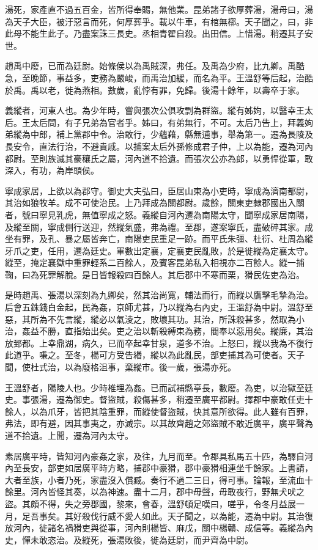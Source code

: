 湯死，家產直不過五百金，皆所得奉賜，無他業。昆弟諸子欲厚葬湯，湯母曰，湯為天子大臣，被汙惡言而死，何厚葬乎。載以牛車，有棺無槨。天子聞之，曰，非此母不能生此子。乃盡案誅三長史。丞相青翟自殺。出田信。上惜湯。稍遷其子安世。

趙禹中廢，已而為廷尉。始條侯以為禹賊深，弗任。及禹為少府，比九卿。禹酷急，至晚節，事益多，吏務為嚴峻，而禹治加緩，而名為平。王溫舒等后起，治酷於禹。禹以老，徙為燕相。數歲，亂悖有罪，免歸。後湯十餘年，以壽卒于家。

義縱者，河東人也。為少年時，嘗與張次公俱攻剽為群盜。縱有姊姁，以醫幸王太后。王太后問，有子兄弟為官者乎。姊曰，有弟無行，不可。太后乃告上，拜義姁弟縱為中郎，補上黨郡中令。治敢行，少蘊藉，縣無逋事，舉為第一。遷為長陵及長安令，直法行治，不避貴戚。以捕案太后外孫修成君子仲，上以為能，遷為河內都尉。至則族滅其豪穰氏之屬，河內道不拾遺。而張次公亦為郎，以勇悍從軍，敢深入，有功，為岸頭侯。

寧成家居，上欲以為郡守。御史大夫弘曰，臣居山東為小吏時，寧成為濟南都尉，其治如狼牧羊。成不可使治民。上乃拜成為關都尉。歲餘，關東吏隸郡國出入關者，號曰寧見乳虎，無值寧成之怒。義縱自河內遷為南陽太守，聞寧成家居南陽，及縱至關，寧成側行送迎，然縱氣盛，弗為禮。至郡，遂案寧氏，盡破碎其家。成坐有罪，及孔、暴之屬皆奔亡，南陽吏民重足一跡。而平氏朱彊、杜衍、杜周為縱牙爪之吏，任用，遷為廷史。軍數出定襄，定襄吏民亂敗，於是徙縱為定襄太守。縱至，掩定襄獄中重罪輕系二百餘人，及賓客昆弟私入相視亦二百餘人。縱一捕鞠，曰為死罪解脫。是日皆報殺四百餘人。其后郡中不寒而栗，猾民佐吏為治。

是時趙禹、張湯以深刻為九卿矣，然其治尚寬，輔法而行，而縱以鷹擊毛摯為治。后會五銖錢白金起，民為姦，京師尤甚，乃以縱為右內史，王溫舒為中尉。溫舒至惡，其所為不先言縱，縱必以氣淩之，敗壞其功。其治，所誅殺甚多，然取為小治，姦益不勝，直指始出矣。吏之治以斬殺縛束為務，閻奉以惡用矣。縱廉，其治放郅都。上幸鼎湖，病久，已而卒起幸甘泉，道多不治。上怒曰，縱以我為不復行此道乎。嗛之。至冬，楊可方受告緡，縱以為此亂民，部吏捕其為可使者。天子聞，使杜式治，以為廢格沮事，棄縱市。後一歲，張湯亦死。

王溫舒者，陽陵人也。少時椎埋為姦。已而試補縣亭長，數廢。為吏，以治獄至廷史。事張湯，遷為御史。督盜賊，殺傷甚多，稍遷至廣平都尉。擇郡中豪敢任吏十餘人，以為爪牙，皆把其陰重罪，而縱使督盜賊，快其意所欲得。此人雖有百罪，弗法，即有避，因其事夷之，亦滅宗。以其故齊趙之郊盜賊不敢近廣平，廣平聲為道不拾遺。上聞，遷為河內太守。

素居廣平時，皆知河內豪姦之家，及往，九月而至。令郡具私馬五十匹，為驛自河內至長安，部吏如居廣平時方略，捕郡中豪猾，郡中豪猾相連坐千餘家。上書請，大者至族，小者乃死，家盡沒入償臧。奏行不過二三日，得可事。論報，至流血十餘里。河內皆怪其奏，以為神速。盡十二月，郡中毋聲，毋敢夜行，野無犬吠之盜。其頗不得，失之旁郡國，黎來，會春，溫舒頓足嘆曰，嗟乎，令冬月益展一月，足吾事矣。其好殺伐行威不愛人如此。天子聞之，以為能，遷為中尉。其治復放河內，徙諸名禍猾吏與從事，河內則楊皆、麻戊，關中楊贛、成信等。義縱為內史，憚未敢恣治。及縱死，張湯敗後，徙為廷尉，而尹齊為中尉。

